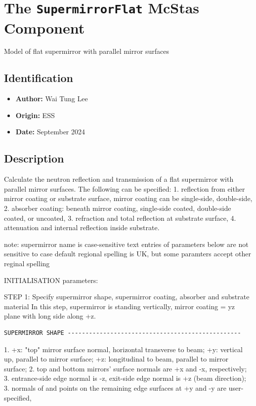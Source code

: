 \section{The \texttt{SupermirrorFlat} McStas Component}
Model of flat supermirror with parallel mirror surfaces

\subsection*{Identification}
\begin{itemize}
  \item \textbf{Author:} Wai Tung Lee
  \item \textbf{Origin:} ESS
  \item \textbf{Date:} September 2024
\end{itemize}

\subsection*{Description}
Calculate the neutron reflection and transmission of a flat supermirror with parallel mirror surfaces. The following can be specified: 1. reflection from either mirror coating or substrate surface, mirror coating can be single-side, double-side, 2. absorber coating: beneath mirror coating, single-side coated, double-side coated, or uncoated, 3. refraction and total reflection at substrate surface, 4. attenuation and internal reflection inside substrate.

note: supermirror name is case-sensitive text entries of parameters below are not sensitive to case default regional spelling is UK, but some paramters accept other reginal spelling

INITIALISATION parameters:

STEP 1: Specify supermirror shape, supermirror coating, absorber and substrate material In this step, supermirror is standing vertically, mirror coating = yz plane with long side along +z.

\begin{verbatim}
SUPERMIRROR SHAPE -------------------------------------------------
\end{verbatim}

1. +x: "top" mirror surface normal, horizontal transverse to beam; +y: vertical up, parallel to mirror surface; +z: longitudinal to beam, parallel to mirror surface; 2. top and bottom mirrors' surface normals are +x and -x, respectively; 3. entrance-side edge normal is -z, exit-side edge normal is +z (beam direction); 3. normals of and points on the remaining edge surfaces at +y and -y are user-specified,

